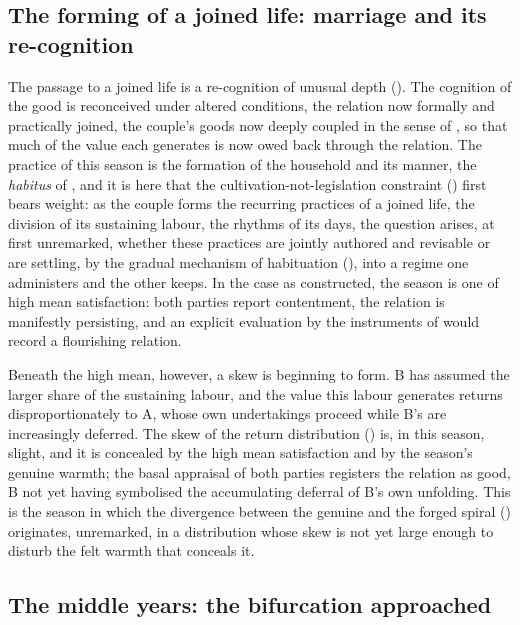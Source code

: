 \subsection{The forming of a joined life: marriage and its re-cognition}
\label{p11:sec:case-marriage}

The passage to a joined life is a re-cognition of unusual depth (). The cognition of the good is reconceived under altered conditions, the relation now formally and practically joined, the couple's goods now deeply coupled in the sense of , so that much of the value each generates is now owed back through the relation. The practice of this season is the formation of the household and its manner, the \emph{habitus} of , and it is here that the cultivation-not-legislation constraint () first bears weight: as the couple forms the recurring practices of a joined life, the division of its sustaining labour, the rhythms of its days, the question arises, at first unremarked, whether these practices are jointly authored and revisable or are settling, by the gradual mechanism of habituation (), into a regime one administers and the other keeps. In the case as constructed, the season is one of high mean satisfaction: both parties report contentment, the relation is manifestly persisting, and an explicit evaluation by the instruments of  would record a flourishing relation.

Beneath the high mean, however, a skew is beginning to form. B has assumed the larger share of the sustaining labour, and the value this labour generates returns disproportionately to A, whose own undertakings proceed while B's are increasingly deferred. The skew of the return distribution () is, in this season, slight, and it is concealed by the high mean satisfaction and by the season's genuine warmth; the basal appraisal of both parties registers the relation as good, B not yet having symbolised the accumulating deferral of B's own unfolding. This is the season in which the divergence between the genuine and the forged spiral () originates, unremarked, in a distribution whose skew is not yet large enough to disturb the felt warmth that conceals it.

\subsection{The middle years: the bifurcation approached}
\label{p11:sec:case-middle}

